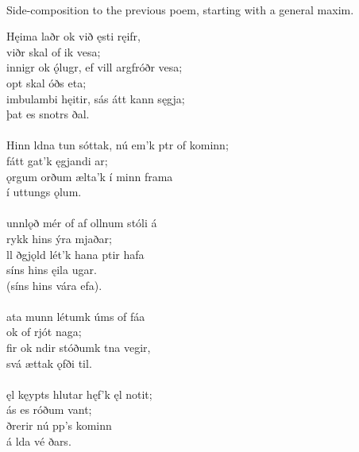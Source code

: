  \\

	Side-composition to the previous poem, starting with a general maxim.

\bva Hęima laðr \hld ok við ęsti ręifr, \\%
\ind {}viðr skal of ik vesa; \\%
innigr ok ǫ́lugr, \hld ef vill argfróðr vesa; \\%
\ind opt skal óðs eta; \\%
imbulambi hęitir, \hld sás átt kann sęgja; \\%
\ind þat es snotrs ðal.\\%

 \\

\bva Hinn ldna tun sóttak, \hld nú em'k ptr of kominn; \\%
\ind fátt gat'k ęgjandi ar; \\%
ǫrgum orðum \hld {}ælta'k í minn frama \\%
\ind í uttungs ǫlum.\\%

 \\

\bva {}unnlǫð mér of af \hld {}ollnum stóli á \\%
\ind {}rykk hins ýra mjaðar; \\%
ll ðgjǫld \hld lét'k hana ptir hafa \\%
\ind síns hins ęila ugar. \\%
\ind (síns hins vára efa).\\%

 \\

\bva {}ata munn \hld létumk úms of fáa \\%
\ind ok of rjót naga; \\%
fir ok ndir \hld stóðumk tna vegir, \\%
\ind svá ættak ǫfði til.\\%

 \\

\bva {}ęl kęypts hlutar \hld hęf'k ęl notit; \\%
\ind {}ás es róðum vant; \\%
ðrerir \hld nú pp's kominn \\%
\ind á lda vé ðars.\\%

